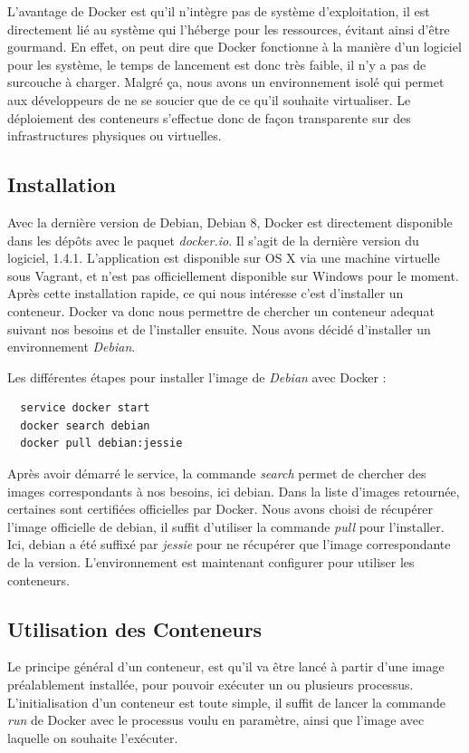 \documentclass[12pt,a4paper]{article}
\begin{document}
L'avantage de Docker est qu'il n'intègre pas de système d'exploitation, il est directement lié au système qui l'héberge pour les ressources, évitant ainsi d'être gourmand. En effet, on peut dire que Docker fonctionne à la manière d'un logiciel pour les système, le temps de lancement est donc très faible, il n'y a pas de surcouche à charger. Malgré ça, nous avons un environnement isolé qui permet aux développeurs de ne se soucier que de ce qu'il souhaite virtualiser. Le déploiement des conteneurs s'effectue donc de façon transparente sur des infrastructures physiques ou virtuelles.

\subsection{Installation}
Avec la dernière version de Debian, Debian 8, Docker est directement disponible dans les dépôts avec le paquet \textit{docker.io}. Il s'agit de la dernière version du logiciel, 1.4.1. L'application est disponible sur OS X via une machine virtuelle sous Vagrant, et n'est pas officiellement disponible sur Windows pour le moment. Après cette installation rapide, ce qui nous intéresse c'est d'installer un conteneur. Docker va donc nous permettre de chercher un conteneur adequat suivant nos besoins et de l'installer ensuite. Nous avons décidé d'installer un environnement \textit{Debian}.

Les différentes étapes pour installer l'image de \textit{Debian} avec Docker :
\begin{lstlisting}
  service docker start
  docker search debian
  docker pull debian:jessie
\end{lstlisting}

Après avoir démarré le service, la commande \textit{search} permet de chercher des images correspondants à nos besoins, ici debian. Dans la liste d'images retournée, certaines sont certifiées officielles par Docker. Nous avons choisi de récupérer l'image officielle de debian, il suffit d'utiliser la commande \textit{pull} pour l'installer. Ici, debian a été suffixé par \textit{jessie} pour ne récupérer que l'image correspondante de la version. L'environnement est maintenant configurer pour utiliser les conteneurs.

\subsection{Utilisation des Conteneurs}

Le principe général d'un conteneur, est qu'il va être lancé à partir d'une image préalablement installée, pour pouvoir exécuter un ou plusieurs processus. L'initialisation d'un conteneur est toute simple, il suffit de lancer la commande \textit{run} de Docker avec le processus voulu en paramètre, ainsi que l'image avec laquelle on souhaite l'exécuter. 
\end{document}
